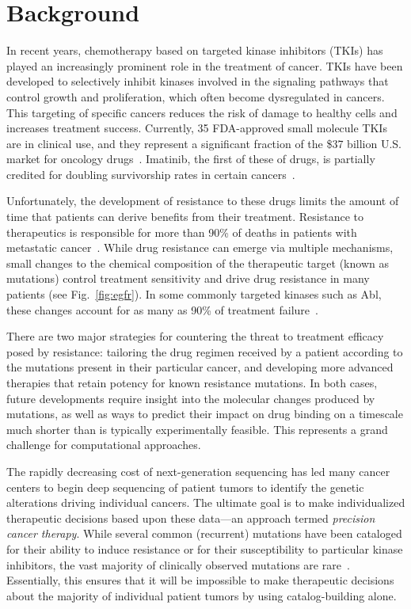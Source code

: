 \documentclass{bmcart}
\begin{document}

\section*{Background}
In recent years, chemotherapy based on targeted kinase inhibitors (TKIs) has
played an increasingly prominent role in the treatment of cancer. TKIs have
been developed to selectively inhibit kinases involved in the signaling
pathways that control growth and proliferation, which often become
dysregulated in cancers. This targeting of specific cancers reduces the risk
of damage to healthy cells and increases treatment success. Currently, 35
FDA-approved small molecule TKIs are in clinical use, and they represent a
significant fraction of the \$37 billion U.S. market for oncology
drugs~\cite{FDA, Zhao2014}. Imatinib, the first of these of drugs, is
partially credited for doubling survivorship rates in certain
cancers~\cite{Zhao2014, ACSreport}.

Unfortunately, the development of resistance to these drugs limits the amount
of time that patients can derive benefits from their treatment. Resistance to
therapeutics is responsible for more than 90\% of deaths in patients with
metastatic cancer~\cite{Longley2005}. While drug resistance can emerge via
multiple mechanisms, small changes to the chemical composition of the
therapeutic target (known as mutations) control treatment sensitivity and
drive drug resistance in many patients (see Fig.~\ref{fig:egfr}). In some
commonly targeted kinases such as Abl, these changes account for as many as
90\% of treatment failure~\cite{Shah2002}.

There are two major strategies for countering the threat to treatment
efficacy posed by resistance: tailoring the drug regimen received by a
patient according to the mutations present in their particular cancer, and
developing more advanced therapies that retain potency for known resistance
mutations. In both cases, future developments require insight into the
molecular changes produced by mutations, as well as ways to predict their
impact on drug binding on a timescale much shorter than is typically
experimentally feasible. This represents a grand challenge for computational
approaches.

The rapidly decreasing cost of next-generation sequencing has led many cancer
centers to begin deep sequencing of patient tumors to identify the genetic
alterations driving individual cancers. The ultimate goal is to make
individualized therapeutic decisions based upon these data---an approach
termed \textit{precision cancer therapy}. While several common (recurrent)
mutations have been cataloged for their ability to induce resistance or for
their susceptibility to particular kinase inhibitors, the vast majority of
clinically observed mutations are rare~\cite{Soverini2011, Zehir2017}. 
Essentially, this ensures that it
will be impossible to make therapeutic decisions about the majority of
individual patient tumors by using catalog-building alone.
\end{document}
